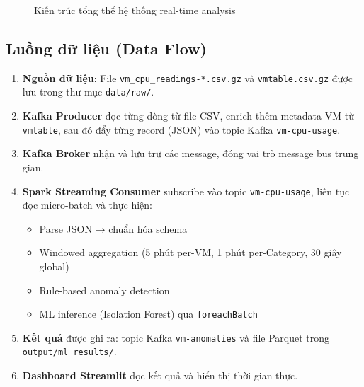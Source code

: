 \documentclass[12pt,a4paper]{article}
\begin{document}
\begin{figure}[H]
\caption{Kiến trúc tổng thể hệ thống real-time analysis}
\end{figure}

\subsection{Luồng dữ liệu (Data Flow)}

\begin{enumerate}
  \item \textbf{Nguồn dữ liệu}: File \texttt{vm\_cpu\_readings-*.csv.gz} và \texttt{vmtable.csv.gz} được lưu trong thư mục \texttt{data/raw/}.
  \item \textbf{Kafka Producer} đọc từng dòng từ file CSV, enrich thêm metadata VM từ \texttt{vmtable}, sau đó đẩy từng record (JSON) vào topic Kafka \texttt{vm-cpu-usage}.
  \item \textbf{Kafka Broker} nhận và lưu trữ các message, đóng vai trò message bus trung gian.
  \item \textbf{Spark Streaming Consumer} subscribe vào topic \texttt{vm-cpu-usage}, liên tục đọc micro-batch và thực hiện:
    \begin{itemize}
      \item Parse JSON → chuẩn hóa schema
      \item Windowed aggregation (5 phút per-VM, 1 phút per-Category, 30 giây global)
      \item Rule-based anomaly detection
      \item ML inference (Isolation Forest) qua \texttt{foreachBatch}
    \end{itemize}
  \item \textbf{Kết quả} được ghi ra: topic Kafka \texttt{vm-anomalies} và file Parquet trong \texttt{output/ml\_results/}.
  \item \textbf{Dashboard Streamlit} đọc kết quả và hiển thị thời gian thực.
\end{enumerate}

\end{document}

